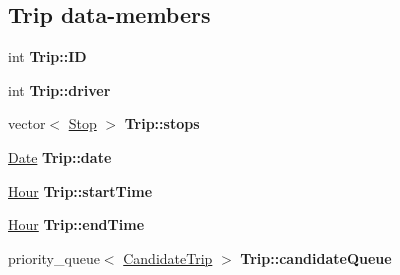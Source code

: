 \subsection*{Trip data-\/members}
\begin{DoxyCompactItemize}
\item 
\mbox{\label{group___trip_gabe6972fc612a3749b72c1c12661cc8ad}} 
int {\bfseries Trip\+::\+ID}
\item 
\mbox{\label{group___trip_ga0831cd90eafbce7ec6b41bdab153b075}} 
int {\bfseries Trip\+::driver}
\item 
\mbox{\label{group___trip_gab432b59947852031ad55e2584991589d}} 
vector$<$ \hyperlink{class_stop}{Stop} $>$ {\bfseries Trip\+::stops}
\item 
\mbox{\label{group___trip_ga1acd0b851878b6f356b9e20d4ad50591}} 
\hyperlink{class_date}{Date} {\bfseries Trip\+::date}
\item 
\mbox{\label{group___trip_ga1e3a66bc72bdf9807a0c02fd7057f22c}} 
\hyperlink{class_hour}{Hour} {\bfseries Trip\+::start\+Time}
\item 
\mbox{\label{group___trip_ga09127f70cc8475615bd0ed3afd8adf2f}} 
\hyperlink{class_hour}{Hour} {\bfseries Trip\+::end\+Time}
\item 
\mbox{\label{group___trip_gab38e11eda78c40f8572e0f80f5201a90}} 
priority\+\_\+queue$<$ \hyperlink{class_candidate_trip}{Candidate\+Trip} $>$ {\bfseries Trip\+::candidate\+Queue}
\end{DoxyCompactItemize}
